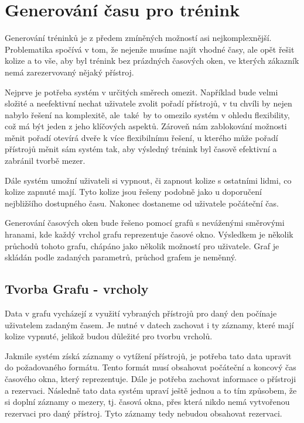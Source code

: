 \section{Generování času pro trénink}
Generování tréninků je z předem zmíněných možností asi nejkomplexnější. Problematika spočívá v tom, že nejenže musíme najít vhodné časy, ale opět řešit kolize a to vše, aby byl trénink bez prázdných časových oken, ve kterých zákazník nemá zarezervovaný nějaký přístroj.

Nejprve je potřeba systém v určitých směrech omezit. Například bude velmi složité a neefektivní nechat uživatele zvolit pořadí přístrojů, v tu chvíli by nejen nabylo řešení na komplexitě, ale~také~by to omezilo systém v ohledu flexibility, což má být jeden z jeho klíčových aspektů. Zároveň nám zablokování možnosti měnit pořadí otevírá dveře k více flexibilnímu řešení, u kterého může pořadí přístrojů měnit sám systém tak, aby výsledný trénink byl časově efektivní a zabránil tvorbě mezer.

Dále systém umožní uživateli si vypnout, či zapnout kolize s ostatními lidmi, co kolize zapnuté mají. Tyto kolize jsou řešeny podobně jako u doporučení nejbližšího dostupného času. Nakonec dostaneme od uživatele počáteční čas. 

Generování časových oken bude řešeno pomocí grafů s neváženými směrovými hranami, kde každý vrchol grafu reprezentuje časové okno. Výsledkem je několik průchodů tohoto grafu, chápáno jako několik možností pro uživatele. Graf je skládán podle zadaných parametrů, průchod grafem je neměnný. 

\subsection{Tvorba Grafu - vrcholy}
Data v grafu vycházejí z využití vybraných přístrojů pro daný den počínaje uživatelem zadaným časem. Je nutné v datech zachovat i ty záznamy, které mají kolize vypnuté, jelikož budou důležité pro tvorbu vrcholů.

Jakmile systém získá záznamy o vytížení přístrojů, je potřeba tato data upravit do požadovaného formátu. Tento formát musí obsahovat počáteční a koncový čas časového okna, který reprezentuje. Dále je potřeba  zachovat informace o přístroji a rezervaci. Následně tato data systém upraví ještě jednou a to tím způsobem, že si doplní záznamy o mezery, tj. časová okna, přes která nikdo nemá vytvořenou rezervaci pro daný přístroj. Tyto záznamy tedy nebudou obsahovat rezervaci. 

